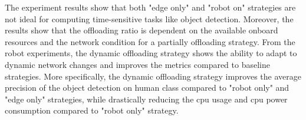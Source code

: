 The experiment results show that both "edge only" and "robot on" strategies are not ideal for computing time-sensitive tasks like object detection. Moreover, the results show that the offloading ratio is dependent on the available onboard resources and the network condition for a partially offloading strategy. From the robot experiments, the dynamic offloading strategy shows the ability to adapt to dynamic network changes and improves the metrics compared to baseline strategies. More specifically, the dynamic offloading strategy improves the average precision of the object detection on human class compared to "robot only" and "edge only" strategies, while drastically reducing the \gls{cpu} usage and \gls{cpu} power consumption compared to "robot only" strategy. 


